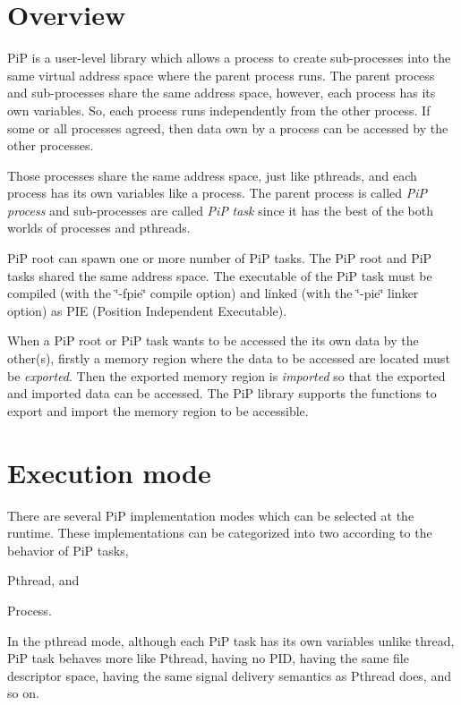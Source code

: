 \hypertarget{index_overview}{}\section{Overview}\label{index_overview}
Pi\-P is a user-\/level library which allows a process to create sub-\/processes into the same virtual address space where the parent process runs. The parent process and sub-\/processes share the same address space, however, each process has its own variables. So, each process runs independently from the other process. If some or all processes agreed, then data own by a process can be accessed by the other processes.

Those processes share the same address space, just like pthreads, and each process has its own variables like a process. The parent process is called {\itshape Pi\-P} {\itshape process} and sub-\/processes are called {\itshape Pi\-P} {\itshape task} since it has the best of the both worlds of processes and pthreads.

Pi\-P root can spawn one or more number of Pi\-P tasks. The Pi\-P root and Pi\-P tasks shared the same address space. The executable of the Pi\-P task must be compiled (with the \char`\"{}-\/fpie\char`\"{} compile option) and linked (with the \char`\"{}-\/pie\char`\"{} linker option) as P\-I\-E (Position Independent Executable).

When a Pi\-P root or Pi\-P task wants to be accessed the its own data by the other(s), firstly a memory region where the data to be accessed are located must be {\itshape exported}. Then the exported memory region is {\itshape imported} so that the exported and imported data can be accessed. The Pi\-P library supports the functions to export and import the memory region to be accessible.\hypertarget{index_execution-mode}{}\section{Execution mode}\label{index_execution-mode}
There are several Pi\-P implementation modes which can be selected at the runtime. These implementations can be categorized into two according to the behavior of Pi\-P tasks,


\begin{DoxyItemize}
\item {\ttfamily Pthread}, and
\item {\ttfamily Process}.
\end{DoxyItemize}

In the pthread mode, although each Pi\-P task has its own variables unlike thread, Pi\-P task behaves more like Pthread, having no P\-I\-D, having the same file descriptor space, having the same signal delivery semantics as Pthread does, and so on.

